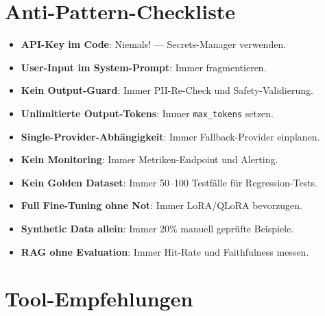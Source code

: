 \section{Anti-Pattern-Checkliste}

\begin{itemize}[leftmargin=*]
     \item \textbf{API-Key im Code}\hspace{0pt}: Niemals! --- Secrets-Manager verwenden.
     \item \textbf{User-Input im System-Prompt}\hspace{0pt}: Immer fragmentieren.
     \item \textbf{Kein Output-Guard}\hspace{0pt}: Immer PII-Re-Check und Safety-Validierung.
     \item \textbf{Unlimitierte Output-Tokens}\hspace{0pt}: Immer \texttt{max\_tokens} setzen.
     \item \textbf{Single-Provider-Abhängigkeit}\hspace{0pt}: Immer Fallback-Provider einplanen.
     \item \textbf{Kein Monitoring}\hspace{0pt}: Immer Metriken-Endpoint und Alerting.
     \item \textbf{Kein Golden Dataset}\hspace{0pt}: Immer 50--100 Testfälle für Regression-Tests.
     \item \textbf{Full Fine-Tuning ohne Not}\hspace{0pt}: Immer LoRA/QLoRA bevorzugen.
     \item \textbf{Synthetic Data allein}\hspace{0pt}: Immer 20\% manuell geprüfte Beispiele.
     \item \textbf{RAG ohne Evaluation}\hspace{0pt}: Immer Hit-Rate und Faithfulness messen.
\end{itemize}

\section{Tool-Empfehlungen}

